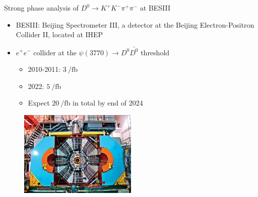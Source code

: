 \documentclass{beamer}
\begin{document}
\begin{frame}{Strong phase analysis of $D^0\to K^+K^-\pi^+\pi^-$ at BESIII}
  \begin{itemize}
    \item{BESIII: Beijing Spectrometer III, a detector at the Beijing Electron-Positron Collider II, located at IHEP}
    \item{$e^+e^-$ collider at the $\psi(3770)\to D^0\bar{D^0}$ threshold}
    \begin{itemize}
      \item{2010-2011: $\SI{3}{\per\femto\barn}$}
      \item{2022: $\SI{5}{\per\femto\barn}$}
      \item{Expect $\SI{20}{\per\femto\barn}$ in total by end of 2024}
    \end{itemize}
  \end{itemize}
  \begin{figure}
    \includegraphics[width = 0.50\textwidth]{Plots/BESIIIDetector.jpg}
  \end{figure}
\end{frame}
\end{document}
